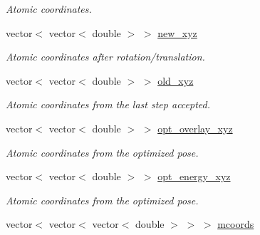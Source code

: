 \begin{DoxyCompactItemize}
\begin{DoxyCompactList}\small\item\em Atomic coordinates. \item\end{DoxyCompactList}\item 
\hypertarget{classMol2_acc192964e0d203c413a24b5344cdcf20}{
vector$<$ vector$<$ double $>$ $>$ \hyperlink{classMol2_acc192964e0d203c413a24b5344cdcf20}{new\_\-xyz}}
\label{classMol2_acc192964e0d203c413a24b5344cdcf20}

\begin{DoxyCompactList}\small\item\em Atomic coordinates after rotation/translation. \item\end{DoxyCompactList}\item 
\hypertarget{classMol2_a610095e1130b4083d386ca5d5e279b1f}{
vector$<$ vector$<$ double $>$ $>$ \hyperlink{classMol2_a610095e1130b4083d386ca5d5e279b1f}{old\_\-xyz}}
\label{classMol2_a610095e1130b4083d386ca5d5e279b1f}

\begin{DoxyCompactList}\small\item\em Atomic coordinates from the last step accepted. \item\end{DoxyCompactList}\item 
\hypertarget{classMol2_a85603d7c0efd02e0300af83d795bffc7}{
vector$<$ vector$<$ double $>$ $>$ \hyperlink{classMol2_a85603d7c0efd02e0300af83d795bffc7}{opt\_\-overlay\_\-xyz}}
\label{classMol2_a85603d7c0efd02e0300af83d795bffc7}

\begin{DoxyCompactList}\small\item\em Atomic coordinates from the optimized pose. \item\end{DoxyCompactList}\item 
\hypertarget{classMol2_a4966098d311df353325581cf73cd9d51}{
vector$<$ vector$<$ double $>$ $>$ \hyperlink{classMol2_a4966098d311df353325581cf73cd9d51}{opt\_\-energy\_\-xyz}}
\label{classMol2_a4966098d311df353325581cf73cd9d51}

\begin{DoxyCompactList}\small\item\em Atomic coordinates from the optimized pose. \item\end{DoxyCompactList}\item 
\hypertarget{classMol2_aaebd576ac40a953d005ab11b90ff60a3}{
vector$<$ vector$<$ vector$<$ double $>$ $>$ $>$ \hyperlink{classMol2_aaebd576ac40a953d005ab11b90ff60a3}{mcoords}}
\label{classMol2_aaebd576ac40a953d005ab11b90ff60a3}


\end{DoxyCompactItemize}
